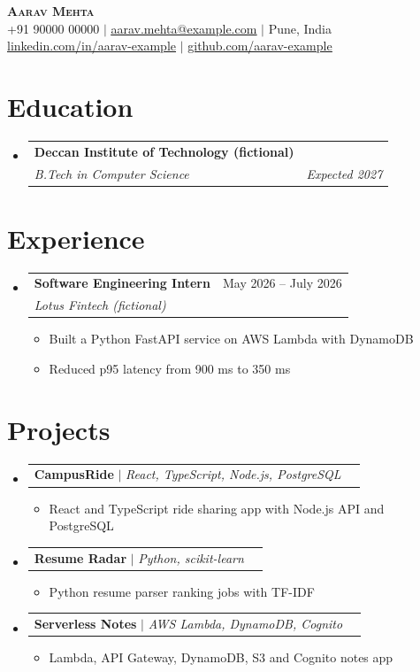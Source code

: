 \documentclass[a4paper,11pt]{article}
\makeatletter
\newcommand{\resumeItem}[1]{
  \item\small{
    {#1 \vspace{-2pt}}
  }
}
\newcommand{\resumeSubheading}[4]{
  \vspace{-2pt}\item
    \begin{tabular*}{0.97\textwidth}[t]{l@{\extracolsep{\fill}}r}
      \textbf{#1} & #2 \\
      \textit{\small#3} & \textit{\small #4} \\
    \end{tabular*}\vspace{-7pt}
}
\newcommand{\resumeProjectHeading}[2]{
    \item
    \begin{tabular*}{0.97\textwidth}{l@{\extracolsep{\fill}}r}
      \small#1 & #2 \\
    \end{tabular*}\vspace{-7pt}
}
\newcommand{\resumeSubHeadingListStart}{\begin{itemize}[leftmargin=0.15in, label={}]}
\newcommand{\resumeSubHeadingListEnd}{\end{itemize}}
\newcommand{\resumeItemListStart}{\begin{itemize}}
\newcommand{\resumeItemListEnd}{\end{itemize}\vspace{-5pt}}
\makeatother
\begin{document}
\begin{center}
    \textbf{\Huge \scshape Aarav Mehta} \\ \vspace{1pt}
    \small +91 90000 00000 $|$ \href{mailto:aarav.mehta@example.com}{\underline{aarav.mehta@example.com}} $|$ Pune, India \\
    \href{https://linkedin.com/in/aarav-example}{\underline{linkedin.com/in/aarav-example}} $|$ \href{https://github.com/aarav-example}{\underline{github.com/aarav-example}}
\end{center}

\section{Education}
  \resumeSubHeadingListStart
    \resumeSubheading
      {Deccan Institute of Technology (fictional)}{}
      {B.Tech in Computer Science}{Expected 2027}
  \resumeSubHeadingListEnd

\section{Experience}
  \resumeSubHeadingListStart
    \resumeSubheading
      {Software Engineering Intern}{May 2026 -- July 2026}
      {Lotus Fintech (fictional)}{}
        \resumeItemListStart
          \resumeItem{Built a Python FastAPI service on AWS Lambda with DynamoDB}
          \resumeItem{Reduced p95 latency from 900 ms to 350 ms}
        \resumeItemListEnd
  \resumeSubHeadingListEnd

\section{Projects}
  \resumeSubHeadingListStart
      \resumeProjectHeading
          {\textbf{CampusRide} $|$ \emph{React, TypeScript, Node.js, PostgreSQL}}{}
        \resumeItemListStart
          \resumeItem{React and TypeScript ride sharing app with Node.js API and PostgreSQL}
        \resumeItemListEnd
      \resumeProjectHeading
          {\textbf{Resume Radar} $|$ \emph{Python, scikit-learn}}{}
        \resumeItemListStart
          \resumeItem{Python resume parser ranking jobs with TF-IDF}
        \resumeItemListEnd
      \resumeProjectHeading
          {\textbf{Serverless Notes} $|$ \emph{AWS Lambda, DynamoDB, Cognito}}{}
        \resumeItemListStart
          \resumeItem{Lambda, API Gateway, DynamoDB, S3 and Cognito notes app}
        \resumeItemListEnd
  \resumeSubHeadingListEnd
\end{document}
